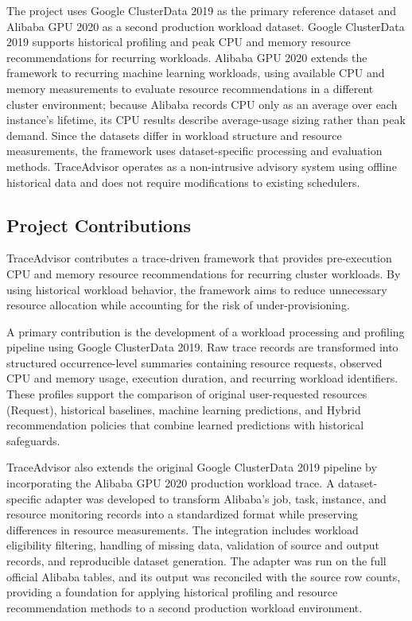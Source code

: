 \documentclass{IEEEtran}
\begin{document}
The project uses Google ClusterData 2019 as the primary reference dataset and Alibaba GPU 2020 as a second production workload dataset. Google ClusterData 2019 supports historical profiling and peak CPU and memory resource recommendations for recurring workloads. Alibaba GPU 2020 extends the framework to recurring machine learning workloads, using available CPU and memory measurements to evaluate resource recommendations in a different cluster environment; because Alibaba records CPU only as an average over each instance's lifetime, its CPU results describe average-usage sizing rather than peak demand. Since the datasets differ in workload structure and resource measurements, the framework uses dataset-specific processing and evaluation methods. TraceAdvisor operates as a non-intrusive advisory system using offline historical data and does not require modifications to existing schedulers.

\subsection{Project Contributions}\label{sec:1.5}

TraceAdvisor contributes a trace-driven framework that provides pre-execution CPU and memory resource recommendations for recurring cluster workloads. By using historical workload behavior, the framework aims to reduce unnecessary resource allocation while accounting for the risk of under-provisioning.

A primary contribution is the development of a workload processing and profiling pipeline using Google ClusterData 2019. Raw trace records are transformed into structured occurrence-level summaries containing resource requests, observed CPU and memory usage, execution duration, and recurring workload identifiers. These profiles support the comparison of original user-requested resources (Request), historical baselines, machine learning predictions, and Hybrid recommendation policies that combine learned predictions with historical safeguards.

TraceAdvisor also extends the original Google ClusterData 2019 pipeline by incorporating the Alibaba GPU 2020 production workload trace. A dataset-specific adapter was developed to transform Alibaba's job, task, instance, and resource monitoring records into a standardized format while preserving differences in resource measurements. The integration includes workload eligibility filtering, handling of missing data, validation of source and output records, and reproducible dataset generation. The adapter was run on the full official Alibaba tables, and its output was reconciled with the source row counts, providing a foundation for applying historical profiling and resource recommendation methods to a second production workload environment.
\end{document}
